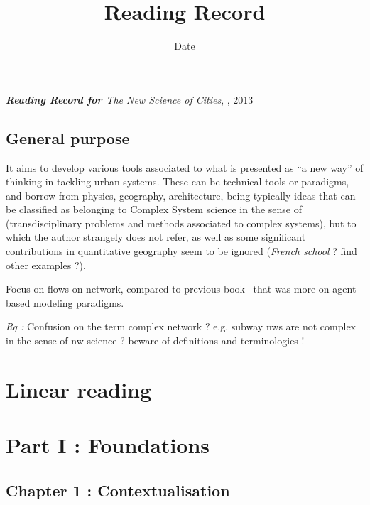 


\title{Reading Record\bigskip\\
\cite{batty2013new}
}
\author{}
\date{Date}


\maketitle

\textbf{\textit{Reading Record for \cite{batty2013new}}}
\textit{The New Science of Cities}, , 2013


\subsection*{General purpose}

It aims to develop various tools associated to what is presented as ``a new way'' of thinking in tackling urban systems. These can be technical tools or paradigms, and borrow from physics, geography, architecture, being typically ideas that can be classified as belonging to Complex System science in the sense of~\cite{chavalarias2009french} (transdisciplinary problems and methods associated to complex systems), but to which the author strangely does not refer, as well as some significant contributions in quantitative geography seem to be ignored (\textit{French school} ? find other examples ?).

Focus on flows on network, compared to previous book~\cite{Bat07} that was more on agent-based modeling paradigms.

\textit{Rq : } Confusion on the term complex network ? e.g. subway nws are not complex in the sense of nw science ? beware of definitions and terminologies !



\section{Linear reading}

\section*{Part I : Foundations}

\subsection{Chapter 1 : Contextualisation}

